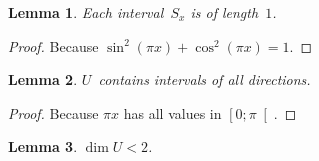 \documentclass[oneside,draft]{amsart}
\newtheorem{lem}{Lemma}
\begin{document}
\begin{lem}
Each interval~$S_x$ is of length~$1$.
\end{lem}

\begin{proof}
Because $\sin^2(\pi x)+\cos^2(\pi x) = 1$.
\end{proof}

\begin{lem}
$U$~contains intervals of all directions.
\end{lem}

\begin{proof}
Because $\pi x$ has all values in $\left[0;\pi\right[$.
\end{proof}

\begin{lem}
$\dim U<2$.
\end{lem}
\end{document}
